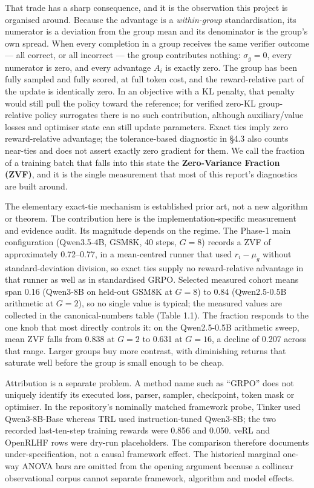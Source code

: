 \documentclass[12pt,a4paper]{report}
\begin{document}
That trade has a sharp consequence, and it is the observation this
project is organised around. Because the advantage is a
\emph{within-group} standardisation, its numerator is a deviation from
the group mean and its denominator is the group's own spread. When every
completion in a group receives the same verifier outcome --- all
correct, or all incorrect --- the group contributes nothing:
\(\sigma_g = 0\), every numerator is zero, and every advantage \(A_i\)
is exactly zero. The group has been fully sampled and fully scored, at
full token cost, and the reward-relative part of the update is
identically zero. In an objective with a KL penalty, that penalty would
still pull the policy toward the reference; for verified zero-KL
group-relative policy surrogates there is no such contribution, although
auxiliary/value losses and optimiser state can still update parameters.
Exact ties imply zero reward-relative advantage; the tolerance-based
diagnostic in §4.3 also counts near-ties and does not assert exactly
zero gradient for them. We call the fraction of a training batch that
falls into this state the \textbf{Zero-Variance Fraction (ZVF)}, and it
is the single measurement that most of this report's diagnostics are
built around.

The elementary exact-tie mechanism is established prior art, not a new
algorithm or theorem. The contribution here is the
implementation-specific measurement and evidence audit. Its magnitude
depends on the regime. The Phase-1 main configuration (Qwen3.5-4B,
GSM8K, 40 steps, \(G = 8\)) records a ZVF of approximately 0.72--0.77,
in a mean-centred runner that used \(r_i-\mu_g\) without
standard-deviation division, so exact ties supply no reward-relative
advantage in that runner as well as in standardised GRPO. Selected
measured cohort means span 0.16 (Qwen3-8B on held-out GSM8K at
\(G = 8\)) to 0.84 (Qwen2.5-0.5B arithmetic at \(G = 2\)), so no single
value is typical; the measured values are collected in the
canonical-numbers table (Table 1.1). The fraction responds to the one
knob that most directly controls it: on the Qwen2.5-0.5B arithmetic
sweep, mean ZVF falls from 0.838 at \(G = 2\) to 0.631 at \(G = 16\), a
decline of 0.207 across that range. Larger groups buy more contrast,
with diminishing returns that saturate well before the group is small
enough to be cheap.

Attribution is a separate problem. A method name such as ``GRPO'' does
not uniquely identify its executed loss, parser, sampler, checkpoint,
token mask or optimiser. In the repository's nominally matched framework
probe, Tinker used Qwen3-8B-Base whereas TRL used instruction-tuned
Qwen3-8B; the two recorded last-ten-step training rewards were 0.856 and
0.050. veRL and OpenRLHF rows were dry-run placeholders. The comparison
therefore documents under-specification, not a causal framework effect.
The historical marginal one-way ANOVA bars are omitted from the opening
argument because a collinear observational corpus cannot separate
framework, algorithm and model effects.
\end{document}
